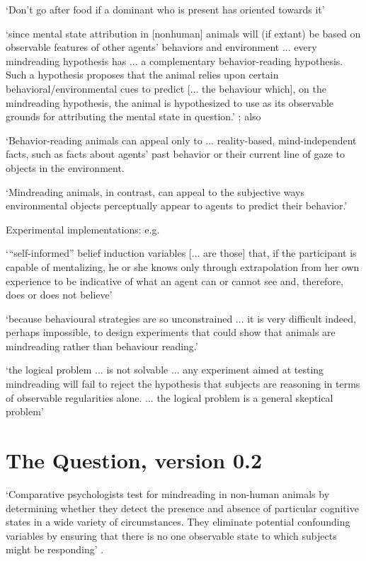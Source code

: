 \documentclass[12pt]{extarticle}
\begin{document}
\begin{multicols*}{3}
‘Don't go after food if a dominant who is present has oriented towards it’
\citep[p.~735]{Penn:2007ey}

‘since mental state attribution in [nonhuman] animals will (if extant) be based on observable
features of other agents’ behaviors and environment ... every mindreading hypothesis has ...
a complementary behavior-reading hypothesis.
Such a hypothesis proposes that the animal relies upon certain behavioral/environmental cues
to predict
[... the behaviour which], on the mindreading hypothesis,
the animal is hypothesized to use as its observable grounds for attributing the
mental state in question.’
\citep[p.~26]{lurz:2011_mindreading}; also \citep[p.~453]{lurz:2011_how}

‘Behavior-reading animals can appeal only to ...
reality-based, mind-independent facts, such as facts about agents’ past behavior or
their current line of gaze to objects in the environment.

‘Mindreading animals, in contrast, can appeal to the subjective ways environmental
objects perceptually appear to agents to predict their behavior.’
\citep[p.~469]{lurz:2011_how}

Experimental implementations: e.g. \citep{karg:2015_goggles}

‘“self-informed” belief induction variables [... are those] that, if the participant is
capable of mentalizing, he or she knows only through extrapolation from her own experience to be
indicative of what an agent can or cannot see and, therefore, does or does not believe’
\citep[p.~139]{heyes:2014_submentalizing}

‘because behavioural strategies are so unconstrained ...
it is very difficult indeed, perhaps impossible, to design experiments
that could show that animals are mindreading rather than behaviour reading.’
\citep[p.~322]{heyes:2014_animal}

‘the logical problem ... is not solvable ...
any experiment aimed at testing mindreading will fail to reject the hypothesis that subjects are
reasoning in terms of observable regularities alone.
... the logical problem is a general skeptical problem’
\citep[pp.~483--5]{halina:2015_there}



\section{The Question, version 0.2}

‘Comparative psychologists test for mindreading in non-human animals by determining whether they
detect the presence and absence of particular cognitive states in a wide variety of
circumstances.
They eliminate potential confounding variables by ensuring that there is no one
observable state to which subjects might be responding’
\citep[p.~487]{halina:2015_there}.


\end{multicols*}
\end{document}
